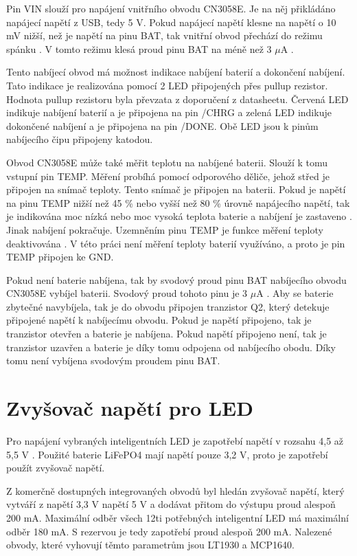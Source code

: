 Pin VIN slouží pro napájení vnitřního obvodu CN3058E. Je na něj přikládáno napájecí napětí z USB, tedy 5 V. Pokud napájecí napětí klesne na napětí o 10 mV nižší, 
než je napětí na pinu BAT, tak vnitřní obvod přechází do režimu spánku \cite{charger_dtsh}. V tomto režimu klesá proud pinu BAT na méně než 3 $\mu$A \cite{charger_dtsh}.

Tento nabíjecí obvod má možnost indikace nabíjení baterií a dokončení nabíjení. Tato indikace je realizována pomocí 2 LED připojených přes pullup rezistor. Hodnota
pullup rezistoru byla převzata z doporučení z datasheetu. Červená LED indikuje nabíjení baterií a je připojena na pin /CHRG a zelená LED indikuje dokončené nabíjení 
a je připojena na pin /DONE. Obě LED jsou k pinům nabíjecího čipu připojeny katodou. 

Obvod CN3058E může také měřit teplotu na nabíjené baterii. Slouží k tomu vstupní pin TEMP. Měření probíhá pomocí odporového děliče, jehož střed je připojen na snímač 
teploty. Tento snímač je připojen na baterii. Pokud je napětí na pinu TEMP nižší než 45 \% nebo vyšší než 80 \% úrovně napájecího napětí, tak je indikována moc nízká
nebo moc vysoká teplota baterie a nabíjení je zastaveno \cite{charger_dtsh}. Jinak nabíjení pokračuje. Uzemněním pinu TEMP je funkce měření teploty deaktivována \cite{charger_dtsh}. 
V této práci není měření teploty baterií využíváno, a proto je pin TEMP připojen ke GND. 


Pokud není baterie nabíjena, tak by svodový proud pinu BAT nabíjecího obvodu CN3058E vybíjel baterii. Svodový proud tohoto pinu je 3 $\mu$A \cite{charger_dtsh}. 
Aby se baterie zbytečné navybíjela, tak je do obvodu připojen tranzistor Q2, který detekuje připojené napětí k nabíjecímu obvodu. Pokud je napětí připojeno, tak je 
tranzistor otevřen a baterie je nabíjena. Pokud napětí připojeno není, tak je tranzistor uzavřen a baterie je díky tomu odpojena od nabíjecího obodu. Díky tomu 
není vybíjena svodovým proudem pinu BAT. 

\section{Zvyšovač napětí pro LED}
Pro napájení vybraných inteligentních LED je zapotřebí napětí v rozsahu 4,5 až 5,5 V \cite{WS2812C_dtsh}. Použité baterie LiFePO4 mají napětí pouze 3,2 V, proto je 
zapotřebí použít zvyšovač napětí. 

Z komerčně dostupných integrovaných obvodů byl hledán zvyšovač napětí, který vytváří z napětí 3,3 V napětí 5 V a dodávat přitom do výstupu proud alespoň 200 mA. 
Maximální odběr všech 12ti potřebných inteligentní LED má maximální odběr 180 mA. S rezervou je tedy zapotřebí proud alespoň 200 mA. Nalezené obvody, které vyhovují 
těmto parametrům jsou LT1930 a MCP1640. 

